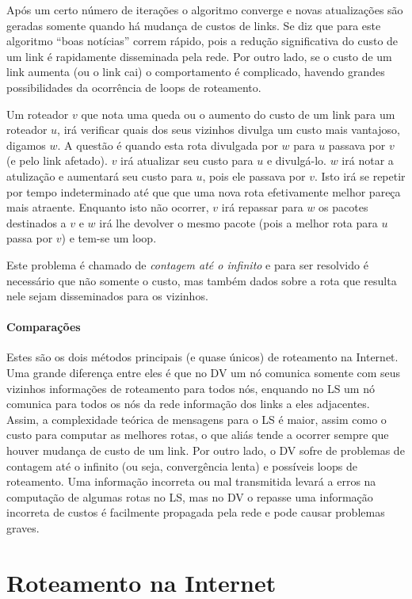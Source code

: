 Após um certo número de iterações o algoritmo converge e novas atualizações são geradas somente quando há mudança de custos de links.
Se diz que para este algoritmo ``boas notícias'' correm rápido, pois a redução significativa do custo de um link é rapidamente disseminada pela rede.
Por outro lado, se o custo de um link aumenta (ou o link cai) o comportamento é complicado, havendo grandes possibilidades da ocorrência de loops de roteamento.

Um roteador $v$ que nota uma queda ou o aumento do custo de um link para um roteador $u$, 
irá verificar quais dos seus vizinhos divulga um custo mais vantajoso, digamos $w$.
A questão é quando esta rota divulgada por $w$ para $u$ passava por $v$ (e pelo link afetado). 
$v$ irá atualizar seu custo para $u$ e divulgá-lo. $w$ irá notar a atulização e aumentará seu custo para $u$, pois ele passava por $v$.
Isto irá se repetir por tempo indeterminado até que que uma nova rota efetivamente melhor pareça mais atraente.
Enquanto isto não ocorrer, $v$ irá repassar para $w$ os pacotes destinados a $v$ e $w$ irá lhe devolver o mesmo pacote (pois a melhor rota para $u$ passa por $v$) e tem-se um loop.

Este problema é chamado de \emph{contagem até o infinito} e para ser resolvido é necessário que não somente o custo, 
mas também dados sobre a rota que resulta nele sejam disseminados para os vizinhos.

\paragraph{Comparações}

Estes são os dois métodos principais (e quase únicos) de roteamento na Internet.
Uma grande diferença entre eles é que no DV um nó comunica somente com seus vizinhos informações de roteamento para todos nós,
enquando no LS um nó comunica para todos os nós da rede informação dos links a eles adjacentes.
Assim, a complexidade teórica de mensagens para o LS é maior, assim como o custo para computar as melhores rotas, o que aliás tende a ocorrer sempre que houver mudança de custo de um link.
Por outro lado, o DV sofre de problemas de contagem até o infinito (ou seja, convergência lenta) e possíveis loops de roteamento.
Uma informação incorreta ou mal transmitida levará a erros na computação de algumas rotas no LS, 
mas no DV o repasse uma informação incorreta de custos é facilmente propagada pela rede e pode causar problemas graves.

\section{Roteamento na Internet}

